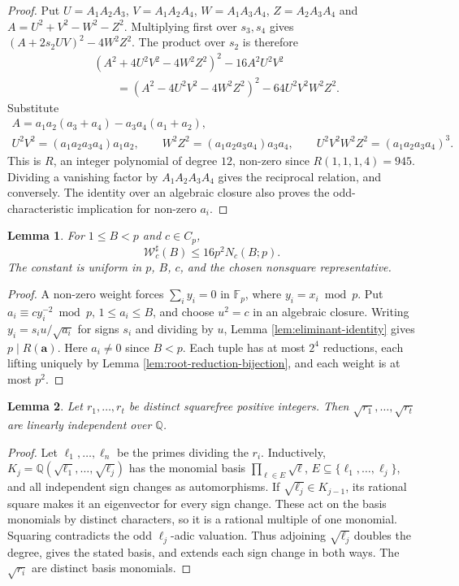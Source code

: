 \documentclass[12pt, a4paper]{amsart}
\numberwithin{equation}{section}
\newcommand{\Q}{\mathbb{Q}}
\newcommand{\F}{\mathbb{F}}
\renewcommand{\le}{\leqslant}
\theoremstyle{plain}
\newtheorem{lem}{Lemma}[section]
\begin{document}
\begin{proof}
Put $U=A_1A_2A_3$, $V=A_1A_2A_4$, $W=A_1A_3A_4$, $Z=A_2A_3A_4$ and ${A=U^2+V^2-W^2-Z^2}$. Multiplying first over $s_3,s_4$ gives $(A+2s_2UV)^2-4W^2Z^2$. The product over $s_2$ is therefore
$$
\begin{aligned}
&(A^2+4U^2V^2-4W^2Z^2)^2-16A^2U^2V^2\\
&\qquad=(A^2-4U^2V^2-4W^2Z^2)^2-64U^2V^2W^2Z^2.
\end{aligned}
$$
Substitute
$$
\begin{gathered}A=a_1a_2(a_3+a_4)-a_3a_4(a_1+a_2),\\ U^2V^2=(a_1a_2a_3a_4)a_1a_2,\qquad W^2Z^2=(a_1a_2a_3a_4)a_3a_4,\qquad U^2V^2W^2Z^2=(a_1a_2a_3a_4)^3.\end{gathered}
$$
This is $R$, an integer polynomial of degree $12$, non-zero since $R(1,1,1,4)=945$. Dividing a vanishing factor by $A_1A_2A_3A_4$ gives the reciprocal relation, and conversely. The identity over an algebraic closure also proves the odd-characteristic implication for non-zero $a_i$.
\end{proof}

\begin{lem}\label{lem:surface}
For $1\le B<p$ and $c\in C_p$,
$$
\mathcal W_c^\sharp(B)\le 16p^2N_c(B;p).
$$
The constant is uniform in $p$, $B$, $c$, and the chosen nonsquare representative.
\end{lem}

\begin{proof}
A non-zero weight forces $\sum_iy_i=0$ in $\F_p$, where $y_i=x_i\bmod p$. Put $a_i\equiv cy_i^{-2}\bmod p$, $1\le a_i\le B$, and choose $u^2=c$ in an algebraic closure. Writing ${y_i=s_iu/\sqrt{a_i}}$ for signs $s_i$ and dividing by $u$, Lemma \ref{lem:eliminant-identity} gives $p\mid R(\mathbf a)$. Here $a_i\ne0$ since $B<p$. Each tuple has at most $2^4$ reductions, each lifting uniquely by Lemma \ref{lem:root-reduction-bijection}, and each weight is at most $p^2$.
\end{proof}

\begin{lem}\label{lem:squarefree-radical-independence}
Let $r_1,\ldots,r_t$ be distinct squarefree positive integers. Then $\sqrt{r_1},\ldots,\sqrt{r_t}$ are linearly independent over $\Q$.
\end{lem}

\begin{proof}
Let $\ell_1,\ldots,\ell_n$ be the primes dividing the $r_i$. Inductively, $K_j=\Q(\sqrt{\ell_1},\ldots,\sqrt{\ell_j})$ has the monomial basis $\prod_{\ell\in E}\sqrt\ell$, $E\subseteq\{\ell_1,\ldots,\ell_j\}$, and all independent sign changes as automorphisms. If $\sqrt{\ell_j}\in K_{j-1}$, its rational square makes it an eigenvector for every sign change. These act on the basis monomials by distinct characters, so it is a rational multiple of one monomial. Squaring contradicts the odd $\ell_j$-adic valuation. Thus adjoining $\sqrt{\ell_j}$ doubles the degree, gives the stated basis, and extends each sign change in both ways. The $\sqrt{r_i}$ are distinct basis monomials.
\end{proof}
\end{document}
